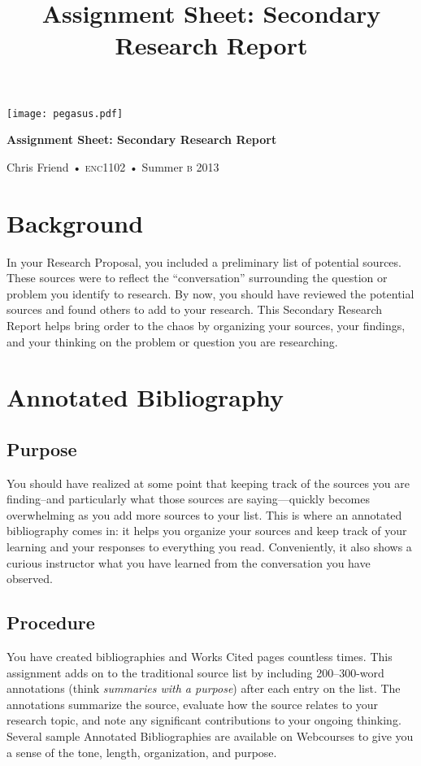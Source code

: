 \documentclass[11pt, oneside]{amsart}	%
\title[Secondary Research Report]{Assignment Sheet: Secondary Research Report}
\begin{document}
%
\thispagestyle{empty}

\vspace{-2in}
\begin{center}
\huge
\texttt{[image: pegasus.pdf]}

\textbf{Assignment Sheet: Secondary Research Report}

{\normalsize Chris Friend • \textsc{enc1102} • Summer \textsc{b} 2013}
\end{center}
\vspace{1.5\baselineskip}

\section{Background} %
\label{sec:background}
In your Research Proposal, you included a preliminary list of potential sources. These sources were to reflect the “conversation” surrounding the question or problem you identify to research. By now, you should have reviewed the potential sources and found others to add to your research. This Secondary Research Report helps bring order to the chaos by organizing your sources, your findings, and your thinking on the problem or question you are researching.


\section{Annotated Bibliography} %
\label{sec:annotated_bibliography}

\subsection{Purpose} %
\label{sec:bib-purpose}
You should have realized at some point that keeping track of the sources you are finding–and particularly what those sources are saying—quickly becomes overwhelming as you add more sources to your list. This is where an annotated bibliography comes in: it helps you organize your sources and keep track of your learning and your responses to everything you read. Conveniently, it also shows a curious instructor what you have learned from the conversation you have observed.

\subsection{Procedure} %
\label{sec:bib-procedure}
You have created bibliographies and Works Cited pages countless times. This assignment adds on to the traditional source list by including 200–300-word annotations (think \emph{summaries with a purpose}) after each entry on the list. The annotations summarize the source, evaluate how the source relates to your research topic, and note any significant contributions to your ongoing thinking. Several sample Annotated Bibliographies are available on Webcourses to give you a sense of the tone, length, organization, and purpose.
\end{document}
